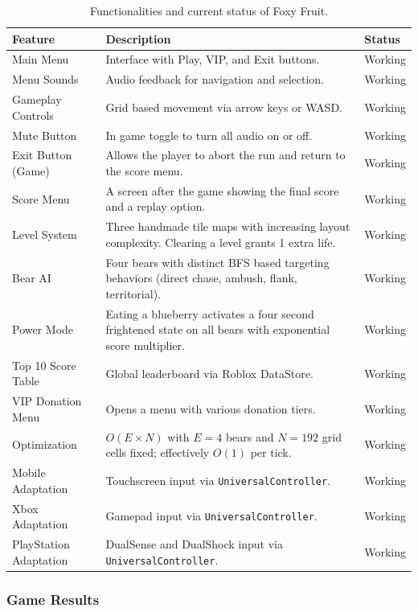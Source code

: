 \documentclass[12pt,letterpaper]{article}
\begin{document}
\begin{table}[H]
\centering
\begin{tabular}{|p{4cm}|p{8cm}|p{2.5cm}|}
\hline
\textbf{Feature} & \textbf{Description} & \textbf{Status} \\
\hline
Main Menu & Interface with Play, VIP, and Exit buttons. & Working \\
\hline
Menu Sounds & Audio feedback for navigation and selection. & Working \\
\hline
Gameplay Controls & Grid based movement via arrow keys or WASD. & Working \\
\hline
Mute Button & In game toggle to turn all audio on or off. & Working \\
\hline
Exit Button (Game) & Allows the player to abort the run and return to the score menu. & Working \\
\hline
Score Menu & A screen after the game showing the final score and a replay option. & Working \\
\hline
Level System & Three handmade tile maps with increasing layout complexity. Clearing a level grants 1 extra life. & Working \\
\hline
Bear AI & Four bears with distinct BFS based targeting behaviors (direct chase, ambush, flank, territorial). & Working \\
\hline
Power Mode & Eating a blueberry activates a four second frightened state on all bears with exponential score multiplier. & Working \\
\hline
Top 10 Score Table & Global leaderboard via Roblox DataStore. & Working \\
\hline
VIP Donation Menu & Opens a menu with various donation tiers. & Working \\
\hline
Optimization & $O(E \times N)$ with $E=4$ bears and $N=192$ grid cells fixed; effectively $O(1)$ per tick. & Working \\
\hline
Mobile Adaptation & Touchscreen input via \texttt{UniversalController}. & Working \\
\hline
Xbox Adaptation & Gamepad input via \texttt{UniversalController}. & Working \\
\hline
PlayStation Adaptation & DualSense and DualShock input via \texttt{UniversalController}. & Working \\
\hline
\end{tabular}
\caption{Functionalities and current status of Foxy Fruit.}
\end{table}

\subsubsection{Game Results}
\end{document}
